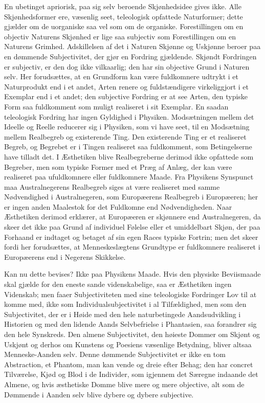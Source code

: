 \documentclass[12pt]{book}
\newcommand{\apage}[1]{\marginnote{\footnotesize\textit{[#1]}}}
\begin{document}
En ubetinget apriorisk, paa sig selv beroende Skjønhedsidee gives ikke. Alle
Skjønhedsformer ere, væsenlig seet, teleologisk opfattede Naturformer; dette
gjælder om de uorganiske saa vel som om de organiske. Forestillingen om en
objectiv Naturens Skjønhed er lige saa subjectiv som Forestillingen om en
Naturens Grimhed. Adskillelsen af det i Naturen Skjønne og Uskjønne beroer paa
en dømmende Subjectivitet, der gjør en Fordring gjældende. Skjøndt Fordringen
er subjectiv, er den dog ikke vilkaarlig; den har sin objective Grund i Naturen
selv. Her forudsættes, at en Grundform kan være fuldkomnere udtrykt i et
Naturprodukt end i et andet, Arten renere og fuldstændigere virkeliggjort i et
Exemplar end i et andet; den subjective Fordring er at see Arten, den typiske
Form \apage{257} saa fuldkomment som muligt realiseret i sit Exemplar. En saadan
teleologisk Fordring har ingen Gyldighed i Physiken. Modsætningen mellem det
Ideelle og Reelle reducerer sig i Physiken, som vi have seet, til en
Modsætning mellem Realbegreb og existerende Ting. Den existerende Ting er et
realiseret Begreb, og Begrebet er i Tingen realiseret saa fuldkomment, som
Betingelserne have tilladt det. I Æsthetiken blive Realbegreberne derimod ikke
opfattede som Begreber, men som typiske Former med et Præg af Anlæg, der kan
være realiseret paa ufuldkomnere eller fuldkomnere Maade. Fra Physikens
Synspunct maa Australnegerens Realbegreb siges at være realiseret med samme
Nødvendighed i Australnegeren, som Europæerens Realbegreb i Europæeren; her er
ingen anden Maalestok for det Fuldkomne end Nødvendigheden. Naar Æsthetiken
derimod erklærer, at Europæeren er skjønnere end Australnegeren, da skeer det
ikke paa Grund af individuel Følelse eller et umiddelbart Skjøn, der paa
Forhaand er indtaget og betaget af sin egen Races typiske Fortrin; men det
skeer fordi her forudsættes, at Menneskeslægtens Grundtype er fuldkomnere
realiseret i Europæerens end i Negerens Skikkelse.

Kan nu dette bevises? Ikke paa Physikens Maade. Hvis den physiske Beviismaade
skal gjælde for den eneste sande videnskabelige, saa er Æsthetiken ingen
Videnskab; men faaer Subjectiviteten med sine teleologiske Fordringer Lov til
at komme med, ikke som Individualsubjectivitet i al Tilfældighed, men som den
Subjectivitet, der er i Høide med den hele naturbetingede \apage{258} Aandsudvikling i
Historien og med den lidende Aands Selvbefrielse i Phantasien, saa forandrer
sig den hele Synskreds. Den almene Subjectivitet, den høieste Dommer om Skjønt
og Uskjønt og derhos om Kunstens og Poesiens væsenlige Betydning, bliver
altsaa Menneske-Aanden selv. Denne dømmende Subjectivitet er ikke en tom
Abstraction, et Phantom, man kan vende og dreie efter Behag; den har concret
Tilværelse, Kjød og Blod i de Individer, som igjennem det Særegne indaande det
Almene, og hvis æsthetiske Domme blive mere og mere objective, alt som de
Dømmende i Aanden selv blive dybere og dybere subjective.
\end{document}

